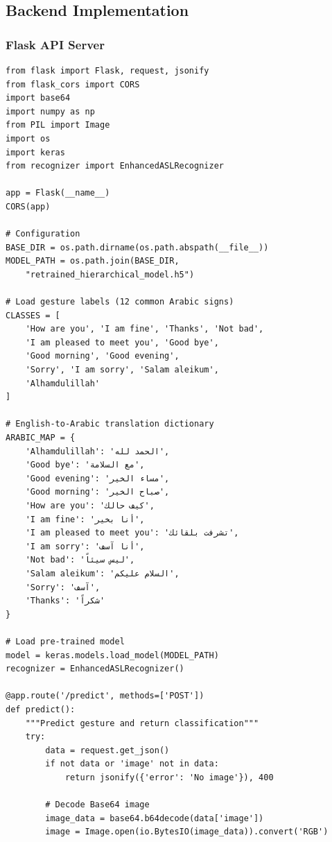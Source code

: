 \documentclass[11pt,a4paper,twoside]{report}
\begin{document}
\subsection{Backend Implementation}
\label{subsec:backend-implementation}

\subsubsection{Flask API Server}
\label{subsubsec:flask-server}

\begin{lstlisting}[style=python, caption={Flask REST API for gesture recognition and translation}, label=lst:flask-api]
from flask import Flask, request, jsonify
from flask_cors import CORS
import base64
import numpy as np
from PIL import Image
import os
import keras
from recognizer import EnhancedASLRecognizer

app = Flask(__name__)
CORS(app)

# Configuration
BASE_DIR = os.path.dirname(os.path.abspath(__file__))
MODEL_PATH = os.path.join(BASE_DIR, 
    "retrained_hierarchical_model.h5")

# Load gesture labels (12 common Arabic signs)
CLASSES = [
    'How are you', 'I am fine', 'Thanks', 'Not bad',
    'I am pleased to meet you', 'Good bye', 
    'Good morning', 'Good evening',
    'Sorry', 'I am sorry', 'Salam aleikum', 
    'Alhamdulillah'
]

# English-to-Arabic translation dictionary
ARABIC_MAP = {
    'Alhamdulillah': 'الحمد لله',
    'Good bye': 'مع السلامة',
    'Good evening': 'مساء الخير',
    'Good morning': 'صباح الخير',
    'How are you': 'كيف حالك',
    'I am fine': 'أنا بخير',
    'I am pleased to meet you': 'تشرفت بلقائك',
    'I am sorry': 'أنا آسف',
    'Not bad': 'ليس سيئاً',
    'Salam aleikum': 'السلام عليكم',
    'Sorry': 'آسف',
    'Thanks': 'شكراً'
}

# Load pre-trained model
model = keras.models.load_model(MODEL_PATH)
recognizer = EnhancedASLRecognizer()

@app.route('/predict', methods=['POST'])
def predict():
    """Predict gesture and return classification"""
    try:
        data = request.get_json()
        if not data or 'image' not in data:
            return jsonify({'error': 'No image'}), 400

        # Decode Base64 image
        image_data = base64.b64decode(data['image'])
        image = Image.open(io.BytesIO(image_data)).convert('RGB')


\end{lstlisting}
\end{document}
